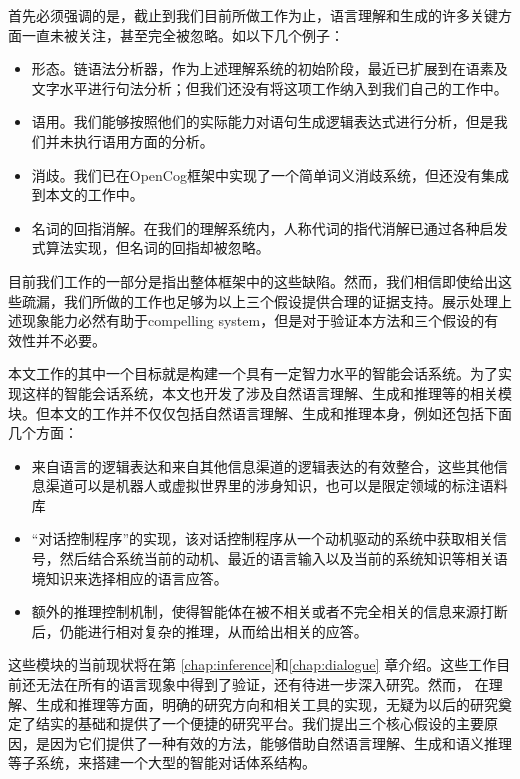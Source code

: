首先必须强调的是，截止到我们目前所做工作为止，语言理解和生成的许多关键方面一直未被关注，甚至完全被忽略。如以下几个例子：
\begin{itemize}
\item 形态。链语法分析器，作为上述理解系统的初始阶段，最近已扩展到在语素及文字水平进行句法分析；但我们还没有将这项工作纳入到我们自己的工作中。
\item 语用。我们能够按照他们的实际能力对语句生成逻辑表达式进行分析，但是我们并未执行语用方面的分析。
\item 消歧。我们已在OpenCog框架中实现了一个简单词义消歧系统，但还没有集成到本文的工作中。
\item 名词的回指消解。在我们的理解系统内，人称代词的指代消解已通过各种启发式算法实现，但名词的回指却被忽略。
\end{itemize}

目前我们工作的一部分是指出整体框架中的这些缺陷。然而，我们相信即使给出这些疏漏，我们所做的工作也足够为以上三个假设提供合理的证据支持。展示处理上述现象能力必然有助于compelling system，但是对于验证本方法和三个假设的有效性并不必要。

本文工作的其中一个目标就是构建一个具有一定智力水平的智能会话系统。为了实现这样的智能会话系统，本文也开发了涉及自然语言理解、生成和推理等的相关模块。但本文的工作并不仅仅包括自然语言理解、生成和推理本身，例如还包括下面几个方面：
\begin{itemize}
\item 来自语言的逻辑表达和来自其他信息渠道的逻辑表达的有效整合，这些其他信息渠道可以是机器人或虚拟世界里的涉身知识，也可以是限定领域的标注语料库
\item “对话控制程序”的实现，该对话控制程序从一个动机驱动的系统中获取相关信号，然后结合系统当前的动机、最近的语言输入以及当前的系统知识等相关语境知识来选择相应的语言应答。
\item 额外的推理控制机制，使得智能体在被不相关或者不完全相关的信息来源打断后，仍能进行相对复杂的推理，从而给出相关的应答。
\end{itemize}

这些模块的当前现状将在第 \ref{chap:inference}和\ref{chap:dialogue} 章介绍。这些工作目前还无法在所有的语言现象中得到了验证，还有待进一步深入研究。然而， 在理解、生成和推理等方面，明确的研究方向和相关工具的实现，无疑为以后的研究奠定了结实的基础和提供了一个便捷的研究平台。我们提出三个核心假设的主要原因，是因为它们提供了一种有效的方法，能够借助自然语言理解、生成和语义推理等子系统，来搭建一个大型的智能对话体系结构。
